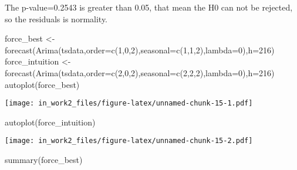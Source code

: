 \documentclass[
]{article}
\newenvironment{Shaded}{\begin{snugshade}}{\end{snugshade}}
\newcommand{\AttributeTok}[1]{\textcolor[rgb]{0.77,0.63,0.00}{#1}}
\newcommand{\DecValTok}[1]{\textcolor[rgb]{0.00,0.00,0.81}{#1}}
\newcommand{\FunctionTok}[1]{\textcolor[rgb]{0.00,0.00,0.00}{#1}}
\newcommand{\NormalTok}[1]{#1}
\newcommand{\OtherTok}[1]{\textcolor[rgb]{0.56,0.35,0.01}{#1}}
\begin{document}
The p-value=0.2543 is greater than 0.05, that mean the H0 can not be
rejected, so the residuals is normality.

\begin{Shaded}
\begin{Highlighting}[]
\NormalTok{  force\_best }\OtherTok{\textless{}{-}} \FunctionTok{forecast}\NormalTok{(}\FunctionTok{Arima}\NormalTok{(tsdata,}\AttributeTok{order=}\FunctionTok{c}\NormalTok{(}\DecValTok{1}\NormalTok{,}\DecValTok{0}\NormalTok{,}\DecValTok{2}\NormalTok{),}\AttributeTok{seasonal=}\FunctionTok{c}\NormalTok{(}\DecValTok{1}\NormalTok{,}\DecValTok{1}\NormalTok{,}\DecValTok{2}\NormalTok{),}\AttributeTok{lambda=}\DecValTok{0}\NormalTok{),}\AttributeTok{h=}\DecValTok{216}\NormalTok{)}
\NormalTok{  force\_intuition }\OtherTok{\textless{}{-}} \FunctionTok{forecast}\NormalTok{(}\FunctionTok{Arima}\NormalTok{(tsdata,}\AttributeTok{order=}\FunctionTok{c}\NormalTok{(}\DecValTok{2}\NormalTok{,}\DecValTok{0}\NormalTok{,}\DecValTok{2}\NormalTok{),}\AttributeTok{seasonal=}\FunctionTok{c}\NormalTok{(}\DecValTok{2}\NormalTok{,}\DecValTok{2}\NormalTok{,}\DecValTok{2}\NormalTok{),}\AttributeTok{lambda=}\DecValTok{0}\NormalTok{),}\AttributeTok{h=}\DecValTok{216}\NormalTok{)}
  \FunctionTok{autoplot}\NormalTok{(force\_best)}
\end{Highlighting}
\end{Shaded}

\texttt{[image: in\_work2\_files/figure-latex/unnamed-chunk-15-1.pdf]}

\begin{Shaded}
\begin{Highlighting}[]
  \FunctionTok{autoplot}\NormalTok{(force\_intuition)}
\end{Highlighting}
\end{Shaded}

\texttt{[image: in\_work2\_files/figure-latex/unnamed-chunk-15-2.pdf]}

\begin{Shaded}
\begin{Highlighting}[]
\FunctionTok{summary}\NormalTok{(force\_best)}
\end{Highlighting}
\end{Shaded}
\end{document}
